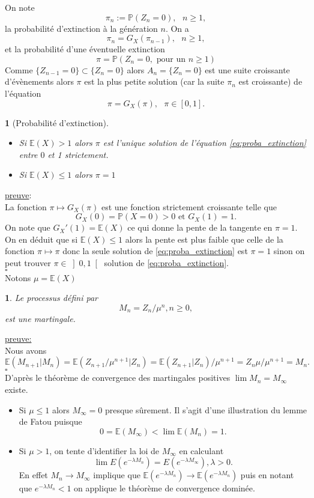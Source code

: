 \documentclass[8pt,notheorems]{beamer}
\def \E{\mathbb E}
\def \P {\mathbb P}
\newtheorem{theorem}{\translate{Theorem}}[section]
\newtheorem{theorem}{\translate{Theoreme}}
\newtheorem{prop}{\translate{Proposition}}
\theoremstyle{definition}
\theoremstyle{example}
\theoremstyle{mystyle}
\theoremstyle{plain}
\begin{document}
\begin{frame}[allowframebreaks]
On note 
$$
\pi_n := \P(Z_n = 0),\text{ }n\geq1,
$$
la probabilité d'extinction à la génération $n$. On a 
\begin{equation}\label{eq:proba_extinction_recurrence}
\pi_n = G_X(\pi_{n-1}),\text{ }n\geq1,
\end{equation}
et la probabilité d'une éventuelle extinction 
$$
\pi = \P\left(Z_n = 0,\text{ pour un }n\geq1\right)
$$
Comme $\{Z_{n-1} = 0\}\subset \{Z_{n} = 0\}$ alors $A_n =\{Z_{n} = 0\}$ est une suite croissante d'évènements alors $\pi$ est la plus petite solution (car la suite $\pi_n$ est croissante) de l'équation 
\begin{equation}\label{eq:proba_extinction}
\pi = G_X(\pi),\text{ }\pi\in[0,1].
\end{equation}
\begin{theorem}[Probabilité d'extinction]
\begin{itemize}
\item Si $\E(X)>1$ alors $\pi$ est l'unique solution de l'équation \eqref{eq:proba_extinction} entre $0$ et 1 strictement. 
\item Si $\E(X)\leq1$ alors $\pi = 1$
\end{itemize}
\end{theorem}
\underline{preuve}:\\
La fonction $\pi\mapsto G_X(\pi)$ est une fonction strictement croissante telle que 
$$
G_X(0) = \P(X=0)>0\text{ et }G_X(1)=1.
$$
On note que $G_X'(1) = \E(X)$ ce qui donne la pente de la tangente en $\pi = 1$. On en déduit que si $\E(X)\leq1$ alors la pente est plus faible que celle de la fonction $\pi\mapsto \pi$ donc la seule solution de \eqref{eq:proba_extinction} est $\pi = 1$ sinon on peut trouver $\pi\in\left]0,1\right[$ solution de \eqref{eq:proba_extinction}.\\
$\square$  \\
Notons $\mu =\E(X)$
\begin{prop}
Le processus défini par 
$$
M_n = Z_n/\mu^n,n\geq 0,
$$
est une martingale.
\end{prop}
\underline{preuve:}\\
Nous avons
$$
\E(M_{n+1}|M_n) =\E(Z_{n+1}/\mu^{n+1}|Z_n) =\E(Z_{n+1}|Z_n)/\mu^{n+1} =Z_n\mu/\mu^{n+1} = M_n.  
$$
$\square$\\

D'après le théorème de convergence des martingales positives $\lim M_n  = M_\infty$ existe.  
\begin{itemize}
    \item Si $\mu\leq1$ alors $M_\infty = 0$ presque sûrement. Il s'agit d'une illustration du lemme de Fatou puisque 
    $$0 = \E(M_\infty)<\lim\E(M_n) = 1.$$
    \item Si $\mu>1$, on tente d'identifier la loi de $M_\infty$ en calculant 
    $$
    \lim E(e^{-\lambda M_n}) = E(e^{-\lambda M_\infty}),\lambda >0. 
    $$
    En effet $M_n\rightarrow M_\infty$ implique que $\E(e^{-\lambda M_n})\rightarrow\E(e^{-\lambda M_n})$ puis en notant que $e^{-\lambda M_n}<1$ on applique le théorème de convergence dominée.
\end{itemize}
\end{frame}
\end{document}

